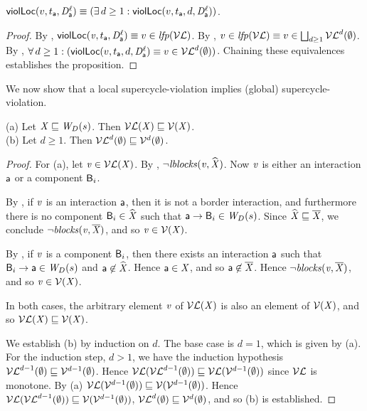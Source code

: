 
\begin{proposition}
\label{prop:locViol-equiv-locViolDist}
$\scVL{v}{t_\act}{\act}{\l} \ev (\ex d \ge 1: \scVLd{v}{d}{t_\act}{\act}{\l})$.
\end{proposition}
%
\begin{proof}
By , $\scVL{\ndv}{t_\act}{\act}{\l} \ev v \in \lfp{\lVFs}$.
By , $v \in \lfp{\lVFs} \ev v \in \JOIN_{d \ge 1} \lVFs^{d} (\ewfg)$.
By , $\fa d \ge 1: (\scVLd{v}{d}{t_\act}{\act}{\l} \ev v \in \lVFs^{d} (\ewfg))$.
Chaining these equivalences establishes the proposition.
\end{proof}


We now show that a local supercycle-violation implies (global) supercycle-violation.

\begin{proposition}
\label{prop:lV-subg-V}
(a) Let $\XS \subg \lwfg{B}{s}{\DS}$. Then $\lVF{\XS} \subg \VF{\XS}$.\\
(b) Let $d \ge 1$. Then $\lVFs^{d} (\ewfg) \subg \VFs^{d} (\ewfg)$.
\end{proposition}
%
\begin{proof}
For (a), let $\ndv \in \lVF{\XS}$. By , $\neg \lblocks{\ndv}{\complL{\XS}}$.
Now $\ndv$ is either an interaction $\act$ or a component $\B_i$. 

By , if $\ndv$ is an interaction $\act$, then it is not a border interaction, and furthermore there is no
component $\B_i \in \complL{\XS}$ such that $\act \ar \B_i \in \lwfg{\B}{s}{\DS}$. 
Since $\complL{\XS} \subg \compl{\XS}$, we conclude $\neg \blocks{\ndv}{\compl{\XS}}$, and so $\ndv \in \VF{\XS}$.

By , if $\ndv$ is a component $\B_i$, then there exists an interaction $\act$ such that 
$\B_i \ar \act \in \lwfg{\B}{s}{\DS}$ and $\act \not\in \complL{\XS}$. Hence $\act \in \XS$, and so $\act \not\in \compl{\XS}$.
Hence  $\neg \blocks{\ndv}{\compl{\XS}}$, and so $\ndv \in \VF{\XS}$.

In both cases, the arbitrary element $\ndv$ of $\lVF{\XS}$ is also an element of $\VF{\XS}$, and so $\lVF{\XS} \subg \VF{\XS}$.

We establish (b) by induction on $d$. The base case is $d=1$, which is given by (a).
For the induction step, $d > 1$, we have the induction hypothesis $\lVFs^{d-1} (\ewfg) \subg \VFs^{d-1} (\ewfg)$. 
Hence $\lVF{\lVFs^{d-1} (\ewfg)} \subg \lVF{\VFs^{d-1} (\ewfg)}$ since $\lVFs$ is monotone.
By (a) $\lVF{\VFs^{d-1} (\ewfg)} \subg \VF{\VFs^{d-1} (\ewfg)}$. 
Hence  $\lVF{\lVFs^{d-1} (\ewfg)} \subg \VF{\VFs^{d-1} (\ewfg)}$, \ie
  $\lVFs^{d} (\ewfg) \subg \VFs^{d} (\ewfg)$, and so (b) is established.
\end{proof}


